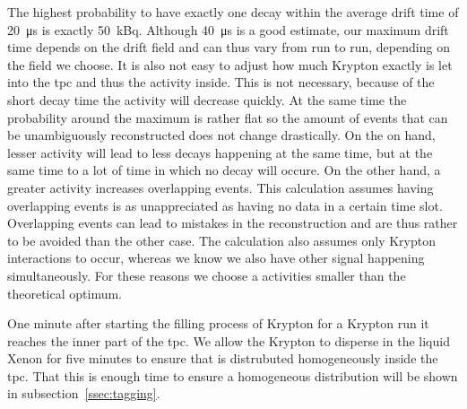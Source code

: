 The highest probability to have exactly one decay within the average drift time of \SI{20}{\micro\s} is exactly \SI{50}{\kilo\becquerel}.
Although \SI{40}{\micro\s} is a good estimate, our maximum drift time depends on the drift field and can thus vary from run to run, depending on the field we choose.
It is also not easy to adjust how much Krypton exactly is let into the \gls{tpc} and thus the activity inside.
This is not necessary, because of the short decay time the activity will decrease quickly.
At the same time the probability around the maximum is rather flat so the amount of events that can be unambiguously reconstructed does not change drastically.
On the on hand, lesser activity will lead to less decays happening at the same time, but at the same time to a lot of time in which no decay will occure.
On the other hand, a greater activity increases overlapping events.
This calculation assumes having overlapping events is as unappreciated as having no data in a certain time slot.
Overlapping events can lead to mistakes in the reconstruction and are thus rather to be avoided than the other case.
The calculation also assumes only Krypton interactions to occur, whereas we know we also have other signal happening simultaneously.
For these reasons we choose a activities smaller than the theoretical optimum.


One minute after starting the filling process of Krypton for a Krypton run it reaches the inner part of the \gls{tpc}.
We allow the Krypton to disperse in the liquid Xenon for five minutes to ensure that is distrubuted homogeneously inside the \gls{tpc}.
That this is enough time to ensure a homogeneous distribution will be shown in subsection~\ref{ssec:tagging}.


















\FloatBarrier
